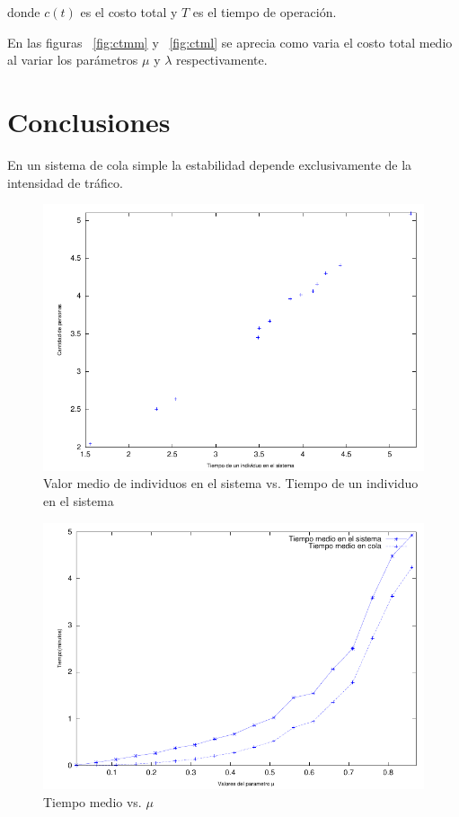 \documentclass{sig-alternate}
\begin{document}
donde $c(t)$ es el costo total y $T$ es el tiempo de operaci\'{o}n.

En las figuras ~\ref{fig:ctmm} y ~\ref{fig:ctml} se aprecia como varia el costo total medio
al variar los par\'{a}metros $\mu$ y $\lambda$ respectivamente.



\section{Conclusiones}\label{conclusiones}

En un sistema de cola simple la estabilidad depende exclusivamente de la
intensidad de tr\'{a}fico.


\begin{figure}[hp]
\centering
\includegraphics[scale=0.8]{graficos/LvsW}
\caption{Valor medio de individuos en el sistema  vs. Tiempo de un individuo en el sistema}
\label{fig:LvsW}
\end{figure}

\begin{figure}[hp]
\centering
\includegraphics[scale=0.8]{graficos/tMediomu}
\caption{Tiempo medio vs. $\mu$}
\label{fig:mu}
\end{figure}
\end{document}

